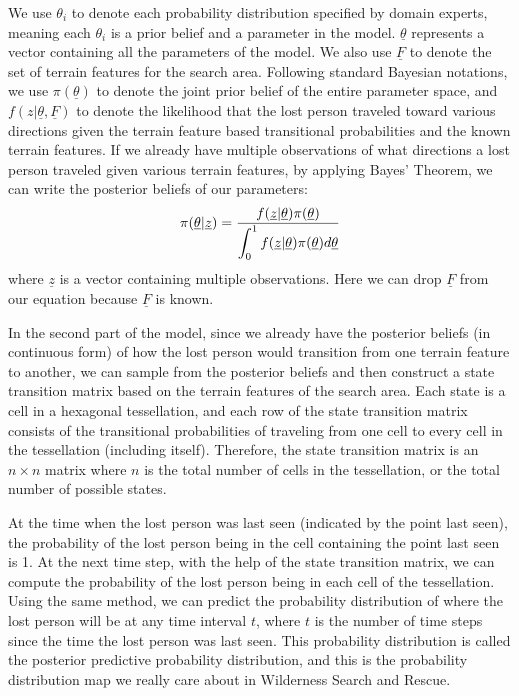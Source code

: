 We use $\theta_i$ to denote each probability distribution specified by domain experts, meaning each $\theta_i$ is a prior belief and a parameter in the model. $\underline{\theta}$ represents a vector containing all the parameters of the model. We also use $\underline{F}$ to denote the set of terrain features for the search area. Following standard Bayesian notations, we use $\pi(\underline{\theta})$ to denote the joint prior belief of the entire parameter space, and $f(z|\underline{\theta}, \underline{F})$ to denote the likelihood that the lost person traveled toward various directions given the terrain feature based transitional probabilities and the known terrain features. If we already have multiple observations of what directions a lost person traveled given various terrain features, by applying Bayes' Theorem, we can write the posterior beliefs of our parameters:
\begin{align}
\label{BayesTherom}
\pi(\underline{\theta}|\underline{z})=\frac{f(\underline{z}|\underline{\theta})\pi(\underline{\theta})}{\displaystyle\displaystyle\int^{1}_{0} f(\underline{z}|\underline{\theta})\pi(\underline{\theta})d\underline{\theta}}
\end{align}
where $\underline{z}$ is a vector containing multiple observations. Here we can drop $\underline{F}$ from our equation because $\underline{F}$ is known.

In the second part of the model, since we already have the posterior beliefs (in continuous form) of how the lost person would transition from one terrain feature to another, we can sample from the posterior beliefs and then construct a state transition matrix based on the terrain features of the search area. Each state is a cell in a hexagonal tessellation, and each row of the state transition matrix consists of the transitional probabilities of traveling from one cell to every cell in the tessellation (including itself). Therefore, the state transition matrix is an $n \times n$ matrix where $n$ is the total number of cells in the tessellation, or the total number of possible states.

At the time when the lost person was last seen (indicated by the point last seen), the probability of the lost person being in the cell containing the point last seen is 1. At the next time step, with the help of the state transition matrix, we can compute the probability of the lost person being in each cell of the tessellation. Using the same method, we can predict the probability distribution of where the lost person will be at any time interval $t$, where $t$ is the number of time steps since the time the lost person was last seen. This probability distribution is called the posterior predictive probability distribution, and this is the probability distribution map we really care about in Wilderness Search and Rescue.

